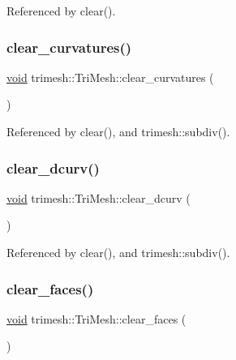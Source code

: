 Referenced by clear().

\mbox{\label{classtrimesh_1_1TriMesh_a1adaa3a2bba086b06079887f6ce29d5f}} 
\subsubsection{\texorpdfstring{clear\+\_\+curvatures()}{clear\_curvatures()}}
{\footnotesize\ttfamily \hyperlink{namespacetrimesh_a784ddfd979e1c579bda795a8edfc3f43}{void} trimesh\+::\+Tri\+Mesh\+::clear\+\_\+curvatures (\begin{DoxyParamCaption}{ }\end{DoxyParamCaption})\hspace{0.3cm}{\ttfamily [inline]}}



Referenced by clear(), and trimesh\+::subdiv().

\mbox{\label{classtrimesh_1_1TriMesh_a0a288ef4ecae755ca55e7c5d01653dfa}} 
\subsubsection{\texorpdfstring{clear\+\_\+dcurv()}{clear\_dcurv()}}
{\footnotesize\ttfamily \hyperlink{namespacetrimesh_a784ddfd979e1c579bda795a8edfc3f43}{void} trimesh\+::\+Tri\+Mesh\+::clear\+\_\+dcurv (\begin{DoxyParamCaption}{ }\end{DoxyParamCaption})\hspace{0.3cm}{\ttfamily [inline]}}



Referenced by clear(), and trimesh\+::subdiv().

\mbox{\label{classtrimesh_1_1TriMesh_a8446be161446102e36d10c79113eb4cf}} 
\subsubsection{\texorpdfstring{clear\+\_\+faces()}{clear\_faces()}}
{\footnotesize\ttfamily \hyperlink{namespacetrimesh_a784ddfd979e1c579bda795a8edfc3f43}{void} trimesh\+::\+Tri\+Mesh\+::clear\+\_\+faces (\begin{DoxyParamCaption}{ }\end{DoxyParamCaption})\hspace{0.3cm}{\ttfamily [inline]}}



